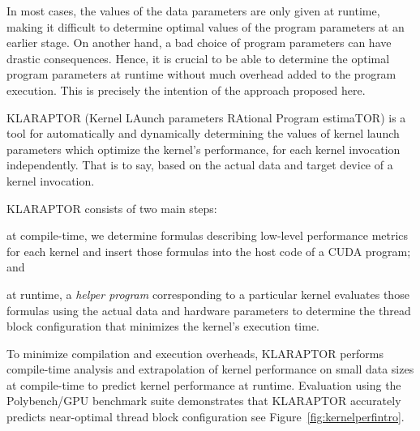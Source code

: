 In most cases, the values of the data parameters are only given at
runtime, making it difficult to determine optimal values of the
program parameters at an earlier stage. On another hand, a bad choice
of program parameters can have drastic consequences.  Hence, it is
crucial to be able to determine the optimal program parameters at
runtime without much overhead added to the program execution. 
This is
precisely the intention of the approach proposed here. %




KLARAPTOR (Kernel LAunch
parameters RAtional Program estimaTOR)
is a tool for automatically and
dynamically determining the values of {\cuda} kernel launch parameters which
optimize the kernel's performance, for each kernel invocation
independently.  That is to say, based on the actual data and target
device of a kernel invocation.

KLARAPTOR consists of two main steps: 
\begin{inparaenum}[(i)]
	\item at compile-time, we determine formulas describing low-level performance metrics 
	for each kernel and insert those formulas into the host code of a CUDA program; and
	\item at runtime, a \textit{helper program} corresponding to a particular kernel evaluates
	those formulas using the actual data and hardware parameters to 
	determine the thread block configuration that minimizes the kernel's execution time. 
\end{inparaenum}

To minimize compilation and execution overheads, KLARAPTOR performs compile-time analysis and extrapolation 
of kernel performance on small data sizes at compile-time to predict kernel performance at runtime. 
Evaluation using the Polybench/GPU benchmark suite
demonstrates that KLARAPTOR accurately predicts near-optimal thread block configuration see Figure~\ref{fig:kernelperfintro}.


